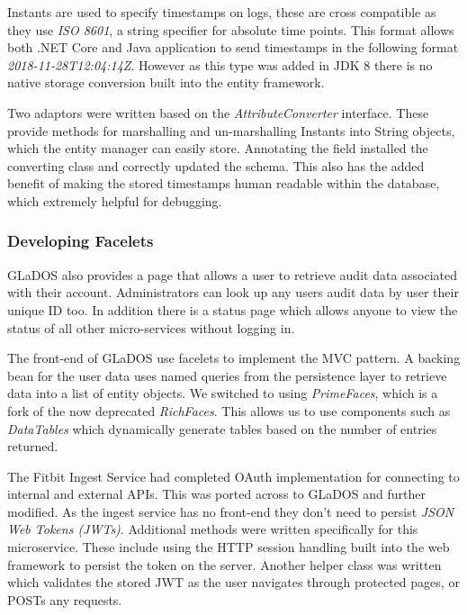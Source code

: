         \par
        Instants are used to specify timestamps on logs, these are cross compatible as they use \textit{ISO 8601}\cite{ISO_8601}, a string specifier for absolute time points. This format allows both .NET Core and Java application to send timestamps in the following format \textit{2018-11-28T12:04:14Z}. However as this type was added in JDK 8 there is no native storage conversion built into the entity framework.

        \par
        Two adaptors were written based on the \textit{AttributeConverter} interface. These provide methods for marshalling and un-marshalling Instants into String objects, which the entity manager can easily store. Annotating the field installed the converting class and correctly updated the schema. This also has the added benefit of making the stored timestamps human readable within the database, which extremely helpful for debugging.

        \subsubsection{Developing Facelets}
        \par
        GLaDOS also provides a page that allows a user to retrieve audit data associated with their account. Administrators can look up any users audit data by user their unique ID too. In addition there is a status page which allows anyone to view the status of all other micro-services without logging in.

        \par
        The front-end of GLaDOS use facelets to implement the MVC pattern. A backing bean for the user data uses named queries from the persistence layer to retrieve data into a list of entity objects. We switched to using \textit{PrimeFaces}\cite{Primefaces}, which is a fork of the now deprecated \textit{RichFaces}. This allows us to use components such as \textit{DataTables} which dynamically generate tables based on the number of entries returned.

        \par
        The Fitbit Ingest Service had completed OAuth implementation for connecting to internal and external APIs. This was ported across to GLaDOS and further modified. As the ingest service has no front-end they don't need to persist \textit{JSON Web Tokens (JWTs)}. Additional methods were written specifically for this microservice. These include using the HTTP session handling built into the web framework to persist the token on the server. Another helper class was written which validates the stored JWT as the user navigates through protected pages, or POSTs any requests.

